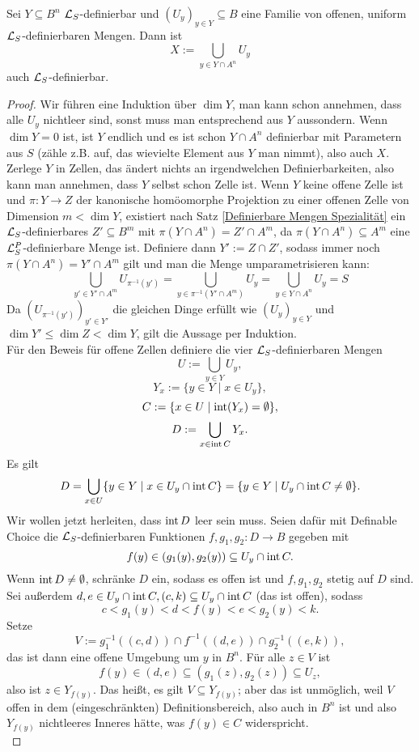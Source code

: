 \begin{lemma}
	Sei $Y\subseteq B^n$ $\mathcal{L}_S$-definierbar und $(U_y)_{y\in Y}\subseteq B$ eine Familie von offenen, uniform $\mathcal{L}_S$-definierbaren Mengen. Dann ist $$X:=\bigcup\limits_{y\in Y\cap A^n}U_y$$ auch $\mathcal{L}_S$-definierbar.
\end{lemma}
\begin{proof}
	Wir führen eine Induktion über $\dim Y$, man kann schon annehmen, dass alle $U_y$ nichtleer sind, sonst muss man entsprechend aus $Y$ aussondern. Wenn $\dim Y=0$ ist, ist $Y$ endlich und es ist schon $Y\cap A^n$ definierbar mit Parametern aus $S$ (zähle z.B. auf, das wievielte Element aus $Y$ man nimmt), also auch $X$.\\
	Zerlege $Y$ in Zellen, das ändert nichts an irgendwelchen Definierbarkeiten, also kann man annehmen, dass $Y$ selbst schon Zelle ist. Wenn $Y$ keine offene Zelle ist und $\pi:Y\rightarrow Z$ der kanonische homöomorphe Projektion zu einer offenen Zelle von Dimension $m<\dim Y$, existiert nach Satz \ref{Definierbare Mengen Spezialität} ein $\mathcal{L}_S$-definierbares $Z'\subseteq B^m$ mit $\pi(Y\cap A^n)=Z'\cap A^m$, da $\pi(Y\cap A^n)\subseteq A^m$ eine $\mathcal{L}^P_S$-definierbare Menge ist. Definiere dann $Y':=Z\cap Z'$, sodass immer noch $\pi(Y\cap A^n)=Y'\cap A^m$ gilt und man die Menge umparametrisieren kann:
	$$\bigcup\limits_{y'\in Y'\cap A^m}U_{\pi^{-1}(y')}=\bigcup\limits_{y\in\pi^{-1}(Y'\cap A^m)}U_y=\bigcup\limits_{y\in Y\cap A^n}U_y=S$$
	Da $(U_{\pi^{-1}(y')})_{y'\in Y'}$ die gleichen Dinge erfüllt wie $(U_y)_{y\in Y}$ und $\dim Y'\leq\dim Z<\dim Y$, gilt die Aussage per Induktion.\\
	Für den Beweis für offene Zellen definiere die vier $\mathcal{L}_S$-definierbaren Mengen $$U:=\bigcup\limits_{y\in Y}U_y,$$ $$Y_x:=\{y\in Y\mid x\in U_y\},$$ $$C:=\{x\in U\mid\operatorname{int}(Y_x)=\emptyset\},$$ $$D:=\bigcup\limits_{x\in\operatorname{int} C}Y_x.$$
	Es gilt $$D=\bigcup\limits_{x\in U}\{y\in Y\mid x\in U_y\cap\operatorname{int} C\}=\{y\in Y\mid U_y\cap\operatorname{int} C\neq\emptyset\}.$$
	Wir wollen jetzt herleiten, dass $\operatorname{int} D$ leer sein muss. Seien dafür mit Definable Choice die $\mathcal{L}_S$-definierbaren Funktionen $f,g_1,g_2:D\rightarrow B$ gegeben mit $$f(y)\in(g_1(y),g_2(y))\subseteq U_y\cap\operatorname{int} C.$$
	Wenn $\operatorname{int} D\neq\emptyset$, schränke $D$ ein, sodass es offen ist und $f,g_1,g_2$ stetig auf $D$ sind. Sei außerdem $d,e\in U_y\cap\operatorname{int} C, (c,k)\subseteq U_y\cap\operatorname{int} C$ (das ist offen), sodass $$c<g_1(y)<d<f(y)<e<g_2(y)<k.$$ Setze $$V:=g_1^{-1}((c,d))\cap f^{-1}((d,e))\cap g_2^{-1}((e,k)),$$ das ist dann eine offene Umgebung um $y$ in $B^n$. Für alle $z\in V$ ist $$f(y)\in(d,e)\subseteq(g_1(z),g_2(z))\subseteq U_z,$$ also ist $z\in Y_{f(y)}$. Das heißt, es gilt $V\subseteq Y_{f(y)}$; aber das ist unmöglich, weil $V$ offen in dem (eingeschränkten) Definitionsbereich, also auch in $B^n$ ist und also $Y_{f(y)}$ nichtleeres Inneres hätte, was $f(y)\in C$ widerspricht.\\

\end{proof}
